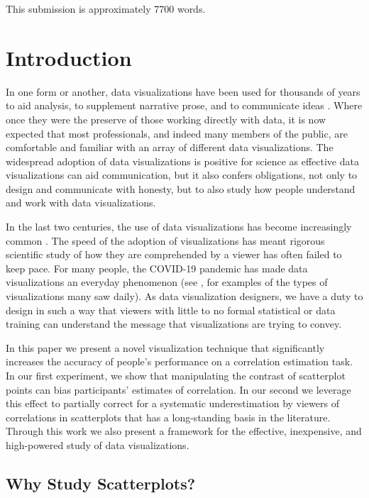 \documentclass[preprint, 3p,
authoryear]{elsarticle} %
\begin{document}
This submission is approximately 7700 words.

\hypertarget{introduction}{%
\section{Introduction}\label{introduction}}

In one form or another, data visualizations have been used for thousands
of years to aid analysis, to supplement narrative prose, and to
communicate ideas \citep{azzam_2013}. Where once they were the preserve
of those working directly with data, it is now expected that most
professionals, and indeed many members of the public, are comfortable
and familiar with an array of different data visualizations. The
widespread adoption of data visualizations is positive for science as
effective data visualizations can aid communication, but it also confers
obligations, not only to design and communicate with honesty, but to
also study how people understand and work with data visualizations.

In the last two centuries, the use of data visualizations has become
increasingly common \citep{friendly_2005, azzam_2013}. The speed of the
adoption of visualizations has meant rigorous scientific study of how
they are comprehended by a viewer has often failed to keep pace. For
many people, the COVID-19 pandemic has made data visualizations an
everyday phenomenon (see \citealp{bbc_2022}, for examples of the types
of visualizations many saw daily). As data visualization designers, we
have a duty to design in such a way that viewers with little to no
formal statistical or data training can understand the message that
visualizations are trying to convey.

In this paper we present a novel visualization technique that
significantly increases the accuracy of people's performance on a
correlation estimation task. In our first experiment, we show that
manipulating the contrast of scatterplot points can bias participants'
estimates of correlation. In our second we leverage this effect to
partially correct for a systematic underestimation by viewers of
correlations in scatterplots that has a long-standing basis in the
literature. Through this work we also present a framework for the
effective, inexpensive, and high-powered study of data visualizations.

\hypertarget{why-study-scatterplots}{%
\subsection{Why Study Scatterplots?}\label{why-study-scatterplots}}
\end{document}
